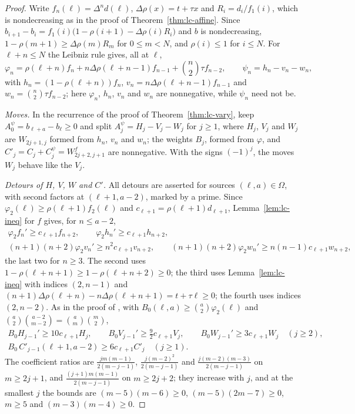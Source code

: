 \begin{proof}
Write $f_n(\ell)=\Delta^nd(\ell)$, $\Delta\rho(x)=t+\tau x$ and $R_i=d_i/f_1(i)$, which is nondecreasing as in the proof of Theorem~\ref{thm:lc-affine}. Since $b_{i+1}-b_i=f_1(i)\bigl(1-\rho(i+1)-\Delta\rho(i)R_i\bigr)$ and $b$ is nondecreasing, $1-\rho(m+1)\geq\Delta\rho(m)R_m$ for $0\leq m<N$, and $\rho(i)\leq1$ for $i\leq N$. For $\ell+n\leq N$ the Leibniz rule gives, all at $\ell$,
\[
\varphi_n=\rho(\ell+n)f_n+n\Delta\rho(\ell+n-1)f_{n-1}+\binom n2\tau f_{n-2},\qquad\psi_n=h_n-v_n-w_n,
\]
with $h_n=(1-\rho(\ell+n))f_n$, $v_n=n\Delta\rho(\ell+n-1)f_{n-1}$ and $w_n=\binom n2\tau f_{n-2}$; here $\varphi_n$, $h_n$, $v_n$ and $w_n$ are nonnegative, while $\psi_n$ need not be.

\emph{Moves.} In the recurrence of the proof of Theorem~\ref{thm:lc-vary}, keep $A^\psi_0=b_{\ell+a}-b_\ell\geq0$ and split $A^\psi_j=H_j-V_j-W_j$ for $j\geq1$, where $H_j$, $V_j$ and $W_j$ are $W_{2j+1,j}$ formed from $h_n$, $v_n$ and $w_n$; the weights $B_j$, formed from $\varphi$, and $C'_j=C_j+C^\psi_j=W^f_{2j+2,j+1}$ are nonnegative. With the signs $(-1)^j$, the moves $W_j$ behave like the $V_j$.

\emph{Detours of $H$, $V$, $W$ and $C'$.} All detours are asserted for sources $(\ell,a)\in\Omega$, with second factors at $(\ell+1,a-2)$, marked by a prime. Since $\varphi_2(\ell)\geq\rho(\ell+1)f_2(\ell)$ and $c_{\ell+1}=\rho(\ell+1)d_{\ell+1}$, Lemma~\ref{lem:lc-ineq} for $f$ gives, for $n\leq a-2$,
\[
\begin{gathered}
\varphi_2f_n'\geq c_{\ell+1}f_{n+2},\qquad\varphi_2h_n'\geq c_{\ell+1}h_{n+2},\\
(n+1)(n+2)\varphi_2v_n'\geq n^2c_{\ell+1}v_{n+2},\qquad(n+1)(n+2)\varphi_2w_n'\geq n(n-1)c_{\ell+1}w_{n+2},
\end{gathered}
\]
the last two for $n\geq3$. The second uses $1-\rho(\ell+n+1)\geq1-\rho(\ell+n+2)\geq0$; the third uses Lemma~\ref{lem:lc-ineq} with indices $(2,n-1)$ and $(n+1)\Delta\rho(\ell+n)-n\Delta\rho(\ell+n+1)=t+\tau\ell\geq0$; the fourth uses indices $(2,n-2)$. As in the proof of \cite[Lemma~]{P1}, with $B_0(\ell,a)\geq\binom a2\varphi_2(\ell)$ and $\binom a2\binom{a-2}{m-2}=\binom am\binom m2$,
\[
\begin{gathered}
B_0H_{j-1}'\geq10c_{\ell+1}H_j,\qquad B_0V_{j-1}'\geq\tfrac92c_{\ell+1}V_j,\qquad B_0W_{j-1}'\geq3c_{\ell+1}W_j\quad(j\geq2),\\
B_0\,C'_{j-1}(\ell+1,a-2)\geq6c_{\ell+1}C'_j\quad(j\geq1).
\end{gathered}
\]
The coefficient ratios are $\frac{jm(m-1)}{2(m-j-1)}$, $\frac{j(m-2)^2}{2(m-j-1)}$ and $\frac{j(m-2)(m-3)}{2(m-j-1)}$ on $m\geq2j+1$, and $\frac{(j+1)m(m-1)}{2(m-j-1)}$ on $m\geq2j+2$; they increase with $j$, and at the smallest $j$ the bounds are $(m-5)(m-6)\geq0$, $(m-5)(2m-7)\geq0$, $m\geq5$ and $(m-3)(m-4)\geq0$.


\end{proof}
